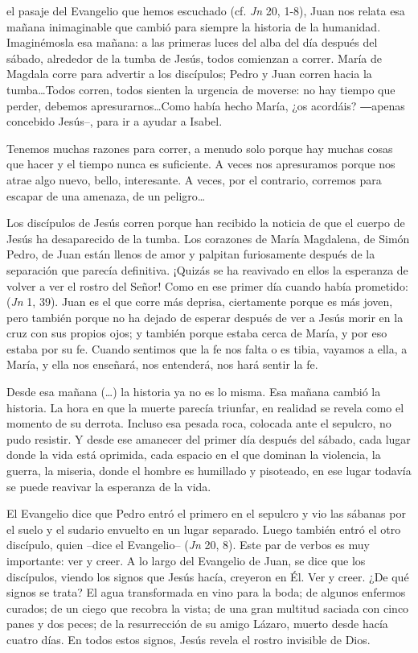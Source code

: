 \begin{body}
 el pasaje del Evangelio que hemos escuchado (cf. \textit{Jn} 20, 1-8), Juan nos relata esa mañana inimaginable que cambió para siempre la historia de la humanidad. Imaginémosla esa mañana: a las primeras luces del alba del día después del sábado, alrededor de la tumba de Jesús, todos comienzan a correr. María de Magdala corre para advertir a los discípulos; Pedro y Juan corren hacia la tumba\ldots Todos corren, todos sienten la urgencia de moverse: no hay tiempo que perder, debemos apresurarnos\ldots Como había hecho María, ¿os acordáis? ―apenas concebido Jesús–, para ir a ayudar a Isabel.

Tenemos muchas razones para correr, a menudo solo porque hay muchas cosas que hacer y el tiempo nunca es suficiente. A veces nos apresuramos porque nos atrae algo nuevo, bello, interesante. A veces, por el contrario, corremos para escapar de una amenaza, de un peligro\ldots

Los discípulos de Jesús corren porque han recibido la noticia de que el cuerpo de Jesús ha desaparecido de la tumba. Los corazones de María Magdalena, de Simón Pedro, de Juan están llenos de amor y palpitan furiosamente después de la separación que parecía definitiva. ¡Quizás se ha reavivado en ellos la esperanza de volver a ver el rostro del Señor! Como en ese primer día cuando había prometido:  (\textit{Jn} 1, 39). Juan es el que corre más deprisa, ciertamente porque es más joven, pero también porque no ha dejado de esperar después de ver a Jesús morir en la cruz con sus propios ojos; y también porque estaba cerca de María, y por eso estaba  por su fe. Cuando sentimos que la fe nos falta o es tibia, vayamos a ella, a María, y ella nos enseñará, nos entenderá, nos hará sentir la fe.

Desde esa mañana (\ldots) la historia ya no es lo misma. Esa mañana cambió la historia. La hora en que la muerte parecía triunfar, en realidad se revela como el momento de su derrota. Incluso esa pesada roca, colocada ante el sepulcro, no pudo resistir. Y desde ese amanecer del primer día después del sábado, cada lugar donde la vida está oprimida, cada espacio en el que dominan la violencia, la guerra, la miseria, donde el hombre es humillado y pisoteado, en ese lugar todavía se puede reavivar la esperanza de la vida.

El Evangelio dice que Pedro entró el primero en el sepulcro y vio las sábanas por el suelo y el sudario envuelto en un lugar separado. Luego también entró el otro discípulo, quien –dice el Evangelio–  (\textit{Jn} 20, 8). Este par de verbos es muy importante: ver y creer. A lo largo del Evangelio de Juan, se dice que los discípulos, viendo los signos que Jesús hacía, creyeron en Él. Ver y creer. ¿De qué signos se trata? El agua transformada en vino para la boda; de algunos enfermos curados; de un ciego que recobra la vista; de una gran multitud saciada con cinco panes y dos peces; de la resurrección de su amigo Lázaro, muerto desde hacía cuatro días. En todos estos signos, Jesús revela el rostro invisible de Dios.


\end{body}
